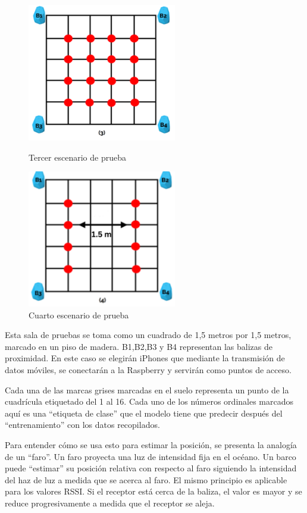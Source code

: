 \begin{figure}[H]
    \begin{minipage}[b]{0.45\textwidth}
        \centering
    \includegraphics[width=6.5cm]{figs/cuatro_apes}
        \caption{Tercer escenario de prueba}
        \label{fig:escenario3}
    \end{minipage}
    \hfill
    \begin{minipage}[b]{0.45\textwidth}
        \centering
    \includegraphics[width=6.5cm]{figs/cuatro_apes_espaciados}
        \caption{Cuarto escenario de prueba}
        \label{fig:escenario4}
    \end{minipage}
\end{figure}


Esta sala de pruebas se toma como un cuadrado de 1,5 metros por 1,5 metros, marcado en un piso de madera. B1,B2,B3 y B4 representan las balizas de proximidad. En este caso se elegirán iPhones que mediante la transmisión de datos móviles, se conectarán a la Raspberry y servirán como puntos de acceso.

Cada una de las marcas grises marcadas en el suelo representa un punto de la cuadrícula etiquetado del 1 al 16. Cada uno de los números ordinales marcados aquí es una “etiqueta de clase” que el modelo tiene que predecir después del “entrenamiento” con los datos recopilados.

Para entender cómo se usa esto para estimar la posición, se presenta la analogía de un “faro”. Un faro proyecta una luz de intensidad fija en el océano. Un barco puede “estimar” su posición relativa con respecto al faro siguiendo la intensidad del haz de luz a medida que se acerca al faro. El mismo principio es aplicable para los valores RSSI. Si el receptor está cerca de la baliza, el valor es mayor y se reduce progresivamente a medida que el receptor se aleja.

